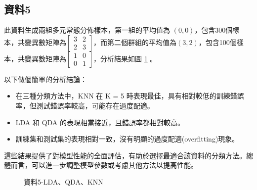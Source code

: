 \documentclass[12pt, a4paper]{article}
\begin{document}
\subsection{資料5}
此資料生成兩組多元常態分佈樣本，第一組的平均值為 $(0, 0)$，包含300個樣本，共變異數矩陣為$\begin{bmatrix}3 & 2 \\2 & 3 \end{bmatrix}$，而第二個群組的平均值為$(3, 2)$，包含100個樣本，共變異數矩陣為$\begin{bmatrix}1 & 0 \\0 & 1 \end{bmatrix}$，分析結果如圖 \ref{fig:la5-LDAQDAKNN} 。

以下做個簡單的分析結論：
\begin{itemize}
\item 在三種分類方法中，KNN 在 K = 5 時表現最佳，具有相對較低的訓練錯誤率，但測試錯誤率較高，可能存在過度配適。
\item LDA 和 QDA 的表現相當接近，且錯誤率都相對較高。
\item 訓練集和測試集的表現相對一致，沒有明顯的過度配適(overfitting)現象。
\end{itemize}
這些結果提供了對模型性能的全面評估，有助於選擇最適合該資料的分類方法。總體而言，可以進一步調整模型參數或考慮其他方法以提高性能。\\
\begin{table} [H]
\centering
    \caption{資料5之LDA、QDA、KNN錯判率}\label{tb:la5-LDAQDAKNN}
    \renewcommand\arraystretch{1.5}
\end{table}
\begin{figure}[H]
    \caption{資料5-LDA、QDA、KNN}
    \label{fig:la5-LDAQDAKNN}
\end{figure}
\end{document}
